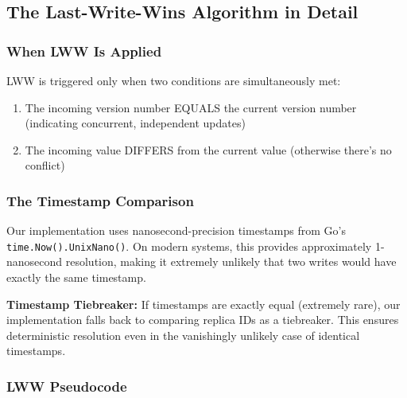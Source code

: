 \documentclass[10pt,a4paper]{article}
\begin{document}
\subsection{The Last-Write-Wins Algorithm in Detail}

\subsubsection{When LWW Is Applied}

LWW is triggered only when two conditions are simultaneously met:
\begin{enumerate}
    \item The incoming version number EQUALS the current version number (indicating concurrent, independent updates)
    \item The incoming value DIFFERS from the current value (otherwise there's no conflict)
\end{enumerate}

\subsubsection{The Timestamp Comparison}

Our implementation uses nanosecond-precision timestamps from Go's \texttt{time.Now().UnixNano()}. On modern systems, this provides approximately 1-nanosecond resolution, making it extremely unlikely that two writes would have exactly the same timestamp.

\textbf{Timestamp Tiebreaker:} If timestamps are exactly equal (extremely rare), our implementation falls back to comparing replica IDs as a tiebreaker. This ensures deterministic resolution even in the vanishingly unlikely case of identical timestamps.

\subsubsection{LWW Pseudocode}
\end{document}
